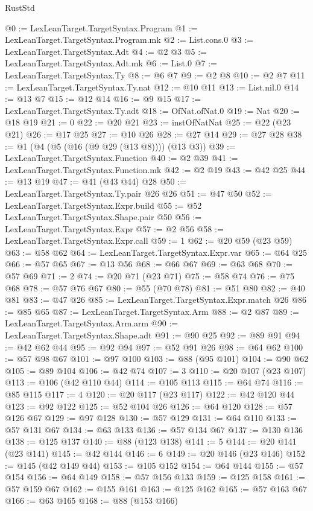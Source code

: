 \begin{lexlean}{RustStd}
\begin{coremodule}
{\begin{coremodule}
{{{{{{{@0 := LexLeanTarget.TargetSyntax.Program
@1 := LexLeanTarget.TargetSyntax.Program.mk
@2 := List.cons.{0}
@3 := LexLeanTarget.TargetSyntax.Adt
@4 := @2 @3
@5 := LexLeanTarget.TargetSyntax.Adt.mk
@6 := List.{0}
@7 := LexLeanTarget.TargetSyntax.Ty
@8 := @6 @7
@9 := @2 @8
@10 := @2 @7
@11 := LexLeanTarget.TargetSyntax.Ty.nat
@12 := @10 @11
@13 := List.nil.{0}
@14 := @13 @7
@15 := @12 @14
@16 := @9 @15
@17 := LexLeanTarget.TargetSyntax.Ty.adt
@18 := OfNat.ofNat.{0}
@19 := Nat
@20 := @18 @19
@21 := 0
@22 := @20 @21
@23 := instOfNatNat
@25 := @22 (@23 @21)
@26 := @17 @25
@27 := @10 @26
@28 := @27 @14
@29 := @27 @28
@38 := @1 (@4 (@5 (@16 (@9 @29 (@13 @8)))) (@13 @3))
@39 := LexLeanTarget.TargetSyntax.Function
@40 := @2 @39
@41 := LexLeanTarget.TargetSyntax.Function.mk
@42 := @2 @19
@43 := @42 @25
@44 := @13 @19
@47 := @41 (@43 @44) @28
@50 := LexLeanTarget.TargetSyntax.Ty.pair @26 @26
@51 := @47 @50
@52 := LexLeanTarget.TargetSyntax.Expr.build
@55 := @52 LexLeanTarget.TargetSyntax.Shape.pair @50
@56 := LexLeanTarget.TargetSyntax.Expr
@57 := @2 @56
@58 := LexLeanTarget.TargetSyntax.Expr.call
@59 := 1
@62 := @20 @59 (@23 @59)
@63 := @58 @62
@64 := LexLeanTarget.TargetSyntax.Expr.var
@65 := @64 @25
@66 := @57 @65
@67 := @13 @56
@68 := @66 @67
@69 := @63 @68
@70 := @57 @69
@71 := 2
@74 := @20 @71 (@23 @71)
@75 := @58 @74
@76 := @75 @68
@78 := @57 @76 @67
@80 := @55 (@70 @78)
@81 := @51 @80
@82 := @40 @81
@83 := @47 @26
@85 := LexLeanTarget.TargetSyntax.Expr.match @26
@86 := @85 @65
@87 := LexLeanTarget.TargetSyntax.Arm
@88 := @2 @87
@89 := LexLeanTarget.TargetSyntax.Arm.arm
@90 := LexLeanTarget.TargetSyntax.Shape.adt
@91 := @90 @25
@92 := @89 @91
@94 := @42 @62 @44
@95 := @92 @94
@97 := @52 @91 @26
@98 := @64 @62
@100 := @57 @98 @67
@101 := @97 @100
@103 := @88 (@95 @101)
@104 := @90 @62
@105 := @89 @104
@106 := @42 @74
@107 := 3
@110 := @20 @107 (@23 @107)
@113 := @106 (@42 @110 @44)
@114 := @105 @113
@115 := @64 @74
@116 := @85 @115
@117 := 4
@120 := @20 @117 (@23 @117)
@122 := @42 @120 @44
@123 := @92 @122
@125 := @52 @104 @26
@126 := @64 @120
@128 := @57 @126 @67
@129 := @97 @128
@130 := @57 @129
@131 := @64 @110
@133 := @57 @131 @67
@134 := @63 @133
@136 := @57 @134 @67
@137 := @130 @136
@138 := @125 @137
@140 := @88 (@123 @138)
@141 := 5
@144 := @20 @141 (@23 @141)
@145 := @42 @144
@146 := 6
@149 := @20 @146 (@23 @146)
@152 := @145 (@42 @149 @44)
@153 := @105 @152
@154 := @64 @144
@155 := @57 @154
@156 := @64 @149
@158 := @57 @156 @133
@159 := @125 @158
@161 := @57 @159 @67
@162 := @155 @161
@163 := @125 @162
@165 := @57 @163 @67
@166 := @63 @165
@168 := @88 (@153 @166)
}}}}}}}
\end{coremodule}}
\end{coremodule}
\end{lexlean}

